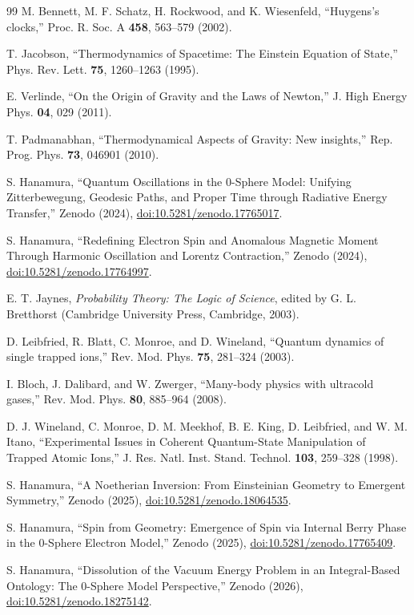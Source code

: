 \documentclass[
 reprint,
 amsmath,amssymb,
 aps,
 prb,
]{revtex4-2}
\numberwithin{equation}{section}
\begin{document}
\begin{thebibliography}{99}
M. Bennett, M. F. Schatz, H. Rockwood, and K. Wiesenfeld, ``Huygens's clocks,'' Proc. R. Soc. A \textbf{458}, 563--579 (2002).

T. Jacobson, ``Thermodynamics of Spacetime: The Einstein Equation of State,'' Phys. Rev. Lett. \textbf{75}, 1260--1263 (1995).

E. Verlinde, ``On the Origin of Gravity and the Laws of Newton,'' J. High Energy Phys. \textbf{04}, 029 (2011).

T. Padmanabhan, ``Thermodynamical Aspects of Gravity: New insights,'' Rep. Prog. Phys. \textbf{73}, 046901 (2010).

S. Hanamura, ``Quantum Oscillations in the 0-Sphere Model: Unifying Zitterbewegung, Geodesic Paths, and Proper Time through Radiative Energy Transfer,'' Zenodo (2024), \href{https://doi.org/10.5281/zenodo.17765017}{doi:10.5281/zenodo.17765017}.

S. Hanamura, ``Redefining Electron Spin and Anomalous Magnetic Moment Through Harmonic Oscillation and Lorentz Contraction,'' Zenodo (2024), \href{https://doi.org/10.5281/zenodo.17764997}{doi:10.5281/zenodo.17764997}.

E. T. Jaynes, \textit{Probability Theory: The Logic of Science}, edited by G. L. Bretthorst (Cambridge University Press, Cambridge, 2003).

D. Leibfried, R. Blatt, C. Monroe, and D. Wineland, ``Quantum dynamics of single trapped ions,'' Rev. Mod. Phys. \textbf{75}, 281--324 (2003).

I. Bloch, J. Dalibard, and W. Zwerger, ``Many-body physics with ultracold gases,'' Rev. Mod. Phys. \textbf{80}, 885--964 (2008).

D. J. Wineland, C. Monroe, D. M. Meekhof, B. E. King, D. Leibfried, and W. M. Itano, ``Experimental Issues in Coherent Quantum-State Manipulation of Trapped Atomic Ions,'' J. Res. Natl. Inst. Stand. Technol. \textbf{103}, 259--328 (1998).

S. Hanamura, ``A Noetherian Inversion: From Einsteinian Geometry to Emergent Symmetry,'' Zenodo (2025), \href{https://doi.org/10.5281/zenodo.18064535}{doi:10.5281/zenodo.18064535}.

S. Hanamura, ``Spin from Geometry: Emergence of Spin via Internal Berry Phase in the 0-Sphere Electron Model,'' Zenodo (2025), \href{https://doi.org/10.5281/zenodo.17765409}{doi:10.5281/zenodo.17765409}.

S. Hanamura, ``Dissolution of the Vacuum Energy Problem in an Integral-Based Ontology: The 0-Sphere Model Perspective,'' Zenodo (2026), \href{https://doi.org/10.5281/zenodo.18275142}{doi:10.5281/zenodo.18275142}.

\end{thebibliography}
\end{document}
